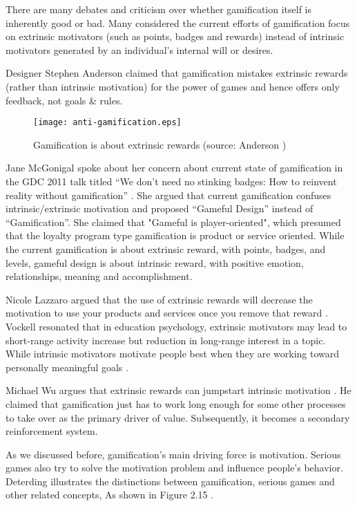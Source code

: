 There are many debates and criticism over whether gamification itself is inherently good or bad. 
Many considered the current efforts of gamification focus on extrinsic motivators (such as points, badges and rewards) instead of intrinsic motivators generated by an individual's internal will or desires.

Designer Stephen Anderson claimed that \cite {anderson2011} gamification mistakes extrinsic rewards (rather than intrinsic motivation) for the power of games and hence offers only feedback, not goals \& rules. 

\begin{figure}[htbp]
	\centering
		\texttt{[image: anti-gamification.eps]}
		\caption{Gamification is about extrinsic rewards (source: Anderson \cite {anderson2011})}
		\label{fig:anti-gamification}
\end{figure}

Jane McGonigal spoke about her concern about current state of gamification in the GDC 2011 talk titled ``We don't need no stinking badges: How to reinvent reality without gamification'' \cite {mcgonigal2011}. She argued that current gamification confuses intrinsic/extrinsic motivation and proposed ``Gameful Design'' instead of ``Gamification''. She claimed that "Gameful is player-oriented", which presumed that the loyalty program type gamification is product or service oriented. While the current gamification is about extrinsic reward, with points, badges, and levels, gameful design is about intrinsic reward, with positive emotion, relationships, meaning and accomplishment.

Nicole Lazzaro argued that the use of extrinsic rewards will decrease the motivation to use your products and services once you remove that reward \cite {Lazzaro2011}. Vockell resonated that in education psychology, extrinsic motivators may lead to short-range activity increase but reduction in long-range interest in a topic. While intrinsic motivators motivate people best when they are working toward personally meaningful goals \cite{vockell2004educational}. 

Michael Wu argues that extrinsic rewards can jumpstart intrinsic motivation  \cite {WuSustainable2011}. He claimed that gamification just has to work long enough for some other processes to take over as the primary driver of value. Subsequently, it becomes a secondary reinforcement system. 

As we discussed before, gamification's main driving force is motivation. Serious games also try to solve the motivation problem and influence people's behavior.  Deterding illustrates the distinctions between gamification, serious games and other related concepts, As shown in Figure 2.15 \cite {Deterding2011mt}.

